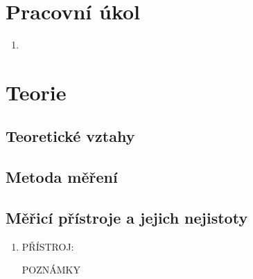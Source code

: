\documentclass{../concepts/titul_protokol_p/prepareprotokol} %
\begin{document}
\renewcommand{\figurename}{Graf}
\renewcommand{\refname}{Literatura}
\renewcommand{\today}{\number\day.\,\number\month.\,\number\year}

\graphicspath{{../concepts/titul_protokol_p/}}
\maketitle

\section{Pracovní úkol}
\begin{enumerate}
    \item
\end{enumerate}

\section{Teorie}
\subsection{Teoretické vztahy}


\subsection{Metoda měření}

\begin{schema}[!htbp]
    \centering
    \caption{Schéma PŘÍSTROJE \cite{pokyny}}
    \label{sch:pristroj}
\end{schema}



\subsection{Měřicí přístroje a jejich nejistoty}
\begin{enumerate}
    \item PŘÍSTROJ:
    
    POZNÁMKY

\end{enumerate}


\end{document}
